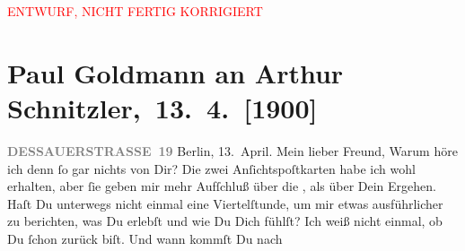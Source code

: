 
\begin{center}
            \textcolor{red}{ENTWURF, NICHT FERTIG KORRIGIERT}
                      \end{center}
            
         
         \newcommand{\erwaehntePersonen}{Personen: Eberhard König, Agnes Sorma}
         \newcommand{\erwaehnteOrte}{Orte: Berlin, Dessauer Straße, Frankfurt am Main, Lessing-Theater, Schauspielhaus, Wien}
         \newcommand{\erwaehnteWerke}{Werke: Gevatter Tod. Ein Märchen von der Menschheit. Drama in fünf Aufzügen, Liebelei. Schauspiel in drei Akten}
               \section[ Paul Goldmann an Arthur Schnitzler, 13. 4. {[}1900{]}]{ Paul Goldmann an Arthur Schnitzler, 13. 4. {[}1900{]}}\nopagebreak{}\rehead{ }\begin{ledgroupsized}[t]{13cm}\normalsize\beginnumbering \toendnotes[C]{\smallbreak\pagebreak[2]} 
\toendnotes[C]{\smallbreak}\pstart{}{\pb}\textcolor{gray}{\textbf{DESSAUERSTRASSE 19}}\pend{}{\bigskip}\pstart
           \raggedleft{}Berlin, 13. April.\pend
           \pstart{}Mein lieber Freund,\pend\pstart
           Warum höre ich denn ſo gar nichts von Dir? Die zwei Anſichtspoſtkarten habe ich wohl
               erhalten, aber ſie geben mir mehr Aufſchluß über die \label{K_L02910-1v}\label{K_L02910-1h}, als über Dein Ergehen. Haſt Du unterwegs nicht einmal eine Viertelſtunde, um
               mir etwas ausführlicher zu berichten, was Du erlebſt und wie Du Dich fühlſt? Ich weiß
               nicht einmal, ob Du ſchon zurück biſt. Und wann kommſt Du nach \label{K_L02910-2v}
\end{ledgroupsized}
